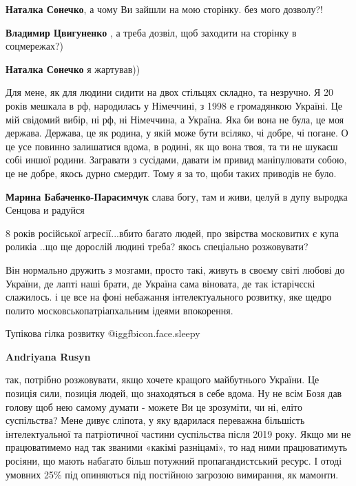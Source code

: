 \begin{itemize}
\begin{itemize}
\textbf{Наталка Сонечко}, а чому Ви зайшли на мою сторінку. без мого дозволу?!

\textbf{Владимир Цвигуненко} , а треба дозвіл, щоб заходити на сторінку в соцмережах?)

\textbf{Наталка Сонечко} я жартував))


\end{itemize} %


Для мене, як для людини сидити на двох стільцях складно, та незручно. Я 20
років мешкала в рф, народилась у Німеччині, з 1998 е громадянкою Україні. Це
мій свідомий вибір, ні рф, ні Німеччина, а Україна. Яка би вона не була, це моя
держава. Держава, це як родина, у якій може бути всіляко, чі добре, чі погане.
О це усе повинно залишатися вдома, в родині, як що вона твоя, та ти не шукаєш
собі иншої родини. Загравати з сусідами, давати ім привид маніпулювати собою,
це не добре, якось дурно смердит. Тому я за то, щоби таких приводів не було.

\begin{itemize} %
\textbf{Марина Бабаченко-Парасимчук} слава богу, там и живи, целуй в дупу выродка Сенцова и радуйся
\end{itemize} %


8 років російської агресії...вбито багато людей, про звірства московитих є купа
роликіа ..що ще дорослій людині треба? якось спеціально розжовувати?

Він нормально дружить з мозгами, просто такі, живуть в своєму світі любові до
України, де лапті наші брати, де Україна сама віновата, де так істарічєскі
слажилось. і це все на фоні небажання інтелектуального розвитку, яке щедро
полито московськопатріапхальним ідеями впокорення.

Тупікова гілка розвитку @igg{fbicon.face.sleepy}

\begin{itemize} %
\textbf{Andriyana Rusyn} 

так, потрібно розжовувати, якщо хочете кращого майбутнього України. Це позиція
сили, позиція людей, що знаходяться в себе вдома. Ну не всім Бозя дав голову
щоб нею самому думати - можете Ви це зрозуміти, чи ні, еліто суспільства? Мене
дивує сліпота, у яку вдарилася переважна більшість інтелектуальної та
патріотичної частини суспільства після 2019 року. Якщо ми не працюватимемо над
так званими «какімі разніцамі», то над ними працюватимуть росіяни, що мають
набагато більш потужний пропагандистський ресурс. І отоді умовних 25\% під
опиняються під постійною загрозою вимирання, як мамонти.



\end{itemize}
\end{itemize}
